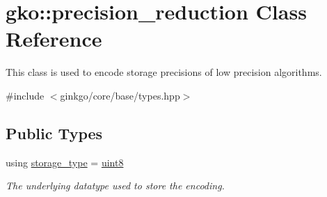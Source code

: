 \hypertarget{classgko_1_1precision__reduction}{}\section{gko\+:\+:precision\+\_\+reduction Class Reference}
\label{classgko_1_1precision__reduction}


This class is used to encode storage precisions of low precision algorithms.  




{\ttfamily \#include $<$ginkgo/core/base/types.\+hpp$>$}

\subsection*{Public Types}
\begin{DoxyCompactItemize}
\item 
\mbox{\label{classgko_1_1precision__reduction_a2a1a94a27fa69b4cc321136b56e7b7d9}} 
using \hyperlink{classgko_1_1precision__reduction_a2a1a94a27fa69b4cc321136b56e7b7d9}{storage\+\_\+type} = \hyperlink{namespacegko_a3950fc3732811a8563484e5098c31531}{uint8}
\begin{DoxyCompactList}\small\item\em The underlying datatype used to store the encoding. \end{DoxyCompactList}\end{DoxyCompactItemize}
